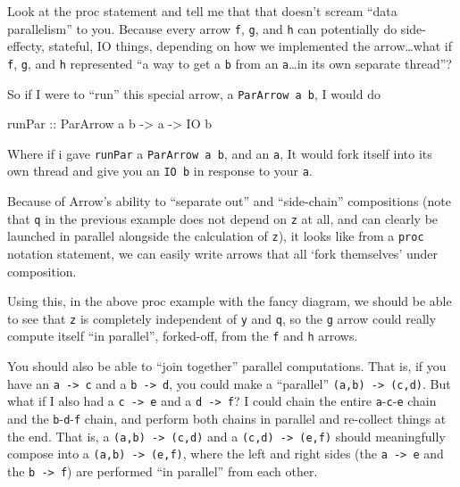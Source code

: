 \documentclass[]{article}
\newenvironment{Shaded}{}{}
\newcommand{\DataTypeTok}[1]{\textcolor[rgb]{0.56,0.13,0.00}{#1}}
\newcommand{\NormalTok}[1]{#1}
\newcommand{\OtherTok}[1]{\textcolor[rgb]{0.00,0.44,0.13}{#1}}
\begin{document}
Look at the proc statement and tell me that that doesn't scream ``data
parallelism'' to you. Because every arrow \texttt{f}, \texttt{g}, and \texttt{h}
can potentially do side-effecty, stateful, IO things, depending on how we
implemented the arrow\ldots what if \texttt{f}, \texttt{g}, and \texttt{h}
represented ``a way to get a \texttt{b} from an \texttt{a}\ldots in its own
separate thread''?

So if I were to ``run'' this special arrow, a \texttt{ParArrow\ a\ b}, I would
do

\begin{Shaded}
\begin{Highlighting}[]
\OtherTok{runPar ::} \DataTypeTok{ParArrow}\NormalTok{ a b }\OtherTok{{-}\textgreater{}}\NormalTok{ a }\OtherTok{{-}\textgreater{}} \DataTypeTok{IO}\NormalTok{ b}
\end{Highlighting}
\end{Shaded}

Where if i gave \texttt{runPar} a \texttt{ParArrow\ a\ b}, and an \texttt{a}, It
would fork itself into its own thread and give you an \texttt{IO\ b} in response
to your \texttt{a}.

Because of Arrow's ability to ``separate out'' and ``side-chain'' compositions
(note that \texttt{q} in the previous example does not depend on \texttt{z} at
all, and can clearly be launched in parallel alongside the calculation of
\texttt{z}), it looks like from a \texttt{proc} notation statement, we can
easily write arrows that all `fork themselves' under composition.

Using this, in the above proc example with the fancy diagram, we should be able
to see that \texttt{z} is completely independent of \texttt{y} and \texttt{q},
so the \texttt{g} arrow could really compute itself ``in parallel'', forked-off,
from the \texttt{f} and \texttt{h} arrows.

You should also be able to ``join together'' parallel computations. That is, if
you have an \texttt{a\ -\textgreater{}\ c} and a \texttt{b\ -\textgreater{}\ d},
you could make a ``parallel'' \texttt{(a,b)\ -\textgreater{}\ (c,d)}. But what
if I also had a \texttt{c\ -\textgreater{}\ e} and a
\texttt{d\ -\textgreater{}\ f}? I could chain the entire
\texttt{a}-\texttt{c}-\texttt{e} chain and the \texttt{b}-\texttt{d}-\texttt{f}
chain, and perform both chains in parallel and re-collect things at the end.
That is, a \texttt{(a,b)\ -\textgreater{}\ (c,d)} and a
\texttt{(c,d)\ -\textgreater{}\ (e,f)} should meaningfully compose into a
\texttt{(a,b)\ -\textgreater{}\ (e,f)}, where the left and right sides (the
\texttt{a\ -\textgreater{}\ e} and the \texttt{b\ -\textgreater{}\ f}) are
performed ``in parallel'' from each other.
\end{document}
